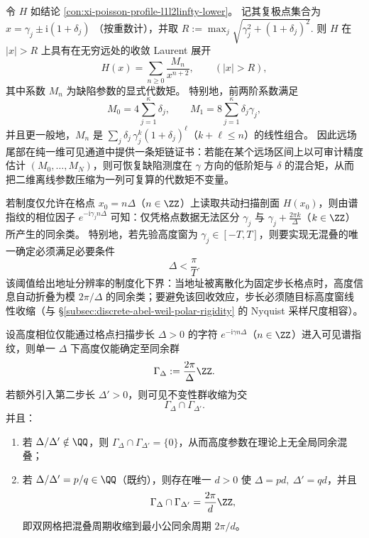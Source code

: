 \begin{proposition}\label{con:xi-farfield-moment-chain}
令 \(H\) 如结论 \ref{con:xi-poisson-profile-l1l2linfty-lower}。
记其复极点集合为
\(
x=\gamma_j\pm \mathrm{i}(1+\delta_j)
\)
（按重数计），并取
\(
R:=\max_j\sqrt{\gamma_j^2+(1+\delta_j)^2}.
\)
则 \(H\) 在 \(|x|>R\) 上具有在无穷远处的收敛 Laurent 展开
\[
H(x)=\sum_{n\ge 0}\frac{M_n}{x^{n+2}},
\qquad (|x|>R),
\]
其中系数 \(M_n\) 为缺陷参数的显式代数矩。
特别地，前两阶系数满足
\[
M_0=4\sum_{j=1}^{\kappa}\delta_j,
\qquad
M_1=8\sum_{j=1}^{\kappa}\delta_j\gamma_j,
\]
并且更一般地，\(M_n\) 是 \(\sum_j \delta_j\,\gamma_j^{k}(1+\delta_j)^{\ell}\)（\(k+\ell\le n\)）的线性组合。
因此远场尾部在纯一维可见通道中提供一条矩链证书：若能在某个远场区间上以可审计精度估计 \((M_0,\dots,M_N)\)，则可恢复缺陷测度在 \(\gamma\) 方向的低阶矩与 \(\delta\) 的混合矩，从而把二维离线参数压缩为一列可复算的代数矩不变量。
\end{proposition}

\begin{proposition}\label{con:xi-grid-scan-aliasing-threshold}
若制度仅允许在格点 \(x_0=n\Delta\)（\(n\in\ZZ\)）上读取共动扫描剖面 \(H(x_0)\)，则由谱指纹的相位因子
\(
e^{-\mathrm{i}\gamma_j n\Delta}
\)
可知：仅凭格点数据无法区分 \(\gamma_j\) 与 \(\gamma_j+\frac{2\pi k}{\Delta}\)（\(k\in\ZZ\)）所产生的同余类。
特别地，若先验高度窗为 \(\gamma_j\in[-T,T]\)，则要实现无混叠的唯一确定必须满足必要条件
\[
\Delta<\frac{\pi}{T}.
\]
该阈值给出地址分辨率的制度化下界：当地址被离散化为固定步长格点时，高度信息自动折叠为模 \(2\pi/\Delta\) 的同余类；要避免该回收效应，步长必须随目标高度窗线性收缩（与 \S\ref{subsec:discrete-abel-weil-polar-rigidity} 的 Nyquist 采样尺度相容）。
\end{proposition}

\begin{proposition}\label{con:xi-grid-scan-two-step-dealiasing}
设高度相位仅能通过格点扫描步长 \(\Delta>0\) 的字符 \(e^{-\mathrm{i}\gamma n\Delta}\)（\(n\in\ZZ\)）进入可见谱指纹，则单一 \(\Delta\) 下高度仅能确定至同余群
\[
\Gamma_{\Delta}:=\frac{2\pi}{\Delta}\ZZ.
\]
若额外引入第二步长 \(\Delta'>0\)，则可见不变性群收缩为交
\[
\Gamma_{\Delta}\cap \Gamma_{\Delta'}.
\]
并且：
\begin{enumerate}
  \item 若 \(\Delta/\Delta'\notin\QQ\)，则 \(\Gamma_{\Delta}\cap \Gamma_{\Delta'}=\{0\}\)，从而高度参数在理论上无全局同余混叠；
  \item 若 \(\Delta/\Delta'=p/q\in\QQ\)（既约），则存在唯一 \(d>0\) 使 \(\Delta=pd,\ \Delta'=qd\)，并且
  \[
  \Gamma_{\Delta}\cap \Gamma_{\Delta'}=\frac{2\pi}{d}\ZZ,
  \]
  即双网格把混叠周期收缩到最小公同余周期 \(2\pi/d\)。
\end{enumerate}
\end{proposition}

